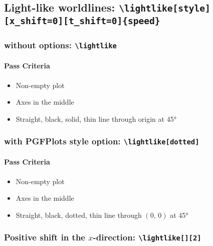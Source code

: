 \documentclass[pagesize,headsepline,parskip=half]{scrartcl}
\begin{document}
      \subsection{Light-like worldlines: \texttt{\textbackslash{}lightlike[style][x\_shift=0][t\_shift=0]\{speed\}}}
        \subsubsection{without options: \texttt{\textbackslash{}lightlike}}
          \begin{spacetimediagram}[grid]
            \lightlike
          \end{spacetimediagram}

          \paragraph{Pass Criteria}
            \begin{itemize}
              \item Non-empty plot
              \item Axes in the middle
              \item Straight, black, solid, thin line through origin at 45°
            \end{itemize}

        \subsubsection{with PGFPlots style option: \texttt{\textbackslash{}lightlike[dotted]}}
          \begin{spacetimediagram}[grid]
            \lightlike[dotted]
          \end{spacetimediagram}

          \paragraph{Pass Criteria}
            \begin{itemize}
              \item Non-empty plot
              \item Axes in the middle
              \item Straight, black, dotted, thin line through $(0, \, 0)$ at 45°
            \end{itemize}

          \subsubsection{Positive shift in the $x$-direction: \texttt{\textbackslash{}lightlike[][2]}}
            \begin{spacetimediagram}
              \lightlike[][2]
            \end{spacetimediagram}
\end{document}
